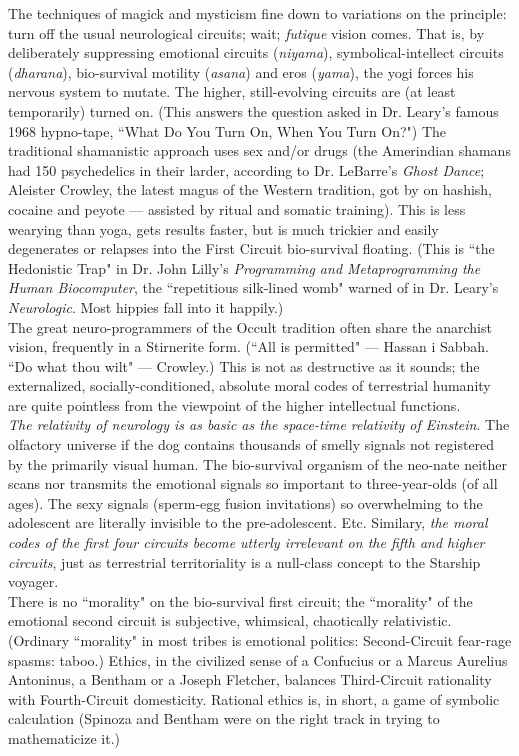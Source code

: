 The techniques of magick and mysticism fine down to variations on the principle: turn off the usual neurological circuits; wait; \emph{futique} vision comes. That is, by deliberately suppressing emotional circuits (\emph{niyama}), symbolical-intellect circuits (\emph{dharana}), bio-survival motility (\emph{asana}) and eros (\emph{yama}), the yogi forces his nervous system to mutate. The higher, still-evolving circuits are (at least temporarily) turned on. (This answers the question asked in Dr. Leary's famous 1968 hypno-tape, ``What Do You Turn On, When You Turn On?") The traditional shamanistic approach uses sex and/or drugs (the Amerindian shamans had 150 psychedelics in their larder, according to Dr. LeBarre's \emph{Ghost Dance}; Aleister Crowley, the latest magus of the Western tradition, got by on hashish, cocaine and peyote --- assisted by ritual and somatic training). This is less wearying than yoga, gets results faster, but is much trickier and easily degenerates or relapses into the First Circuit bio-survival floating. (This is ``the Hedonistic Trap" in Dr. John Lilly's \emph{Programming and Metaprogramming the Human Biocomputer}, the ``repetitious silk-lined womb" warned of in Dr. Leary's \emph{Neurologic}. Most hippies fall into it happily.)\\
The great neuro-programmers of the Occult tradition often share the anarchist vision, frequently in a Stirnerite form. (``All is permitted" --- Hassan i Sabbah. ``Do what thou wilt" --- Crowley.) This is not as destructive as it sounds; the externalized, socially-conditioned, absolute moral codes of terrestrial humanity are quite pointless from the viewpoint of the higher intellectual functions.\\
\emph{The relativity of neurology is as basic as the space-time relativity of Einstein}. The olfactory universe if the dog contains thousands of smelly signals not registered by the primarily visual human. The bio-survival organism of the neo-nate neither scans nor transmits the emotional signals so important to three-year-olds (of all ages). The sexy signals (sperm-egg fusion invitations) so overwhelming to the adolescent are literally invisible to the pre-adolescent. Etc. Similary, \emph{the moral codes of the first four circuits become utterly irrelevant on the fifth and higher circuits}, just as terrestrial territoriality is a null-class concept to the Starship voyager.\\
There is no ``morality" on the bio-survival first circuit; the ``morality" of the emotional second circuit is subjective, whimsical, chaotically relativistic. (Ordinary ``morality" in most tribes is emotional politics: Second-Circuit fear-rage spasms: taboo.) Ethics, in the civilized sense of a Confucius or a Marcus Aurelius Antoninus, a Bentham or a Joseph Fletcher, balances Third-Circuit rationality with Fourth-Circuit domesticity. Rational ethics is, in short, a game of symbolic calculation (Spinoza and Bentham were on the right track in trying to mathematicize it.)\\
